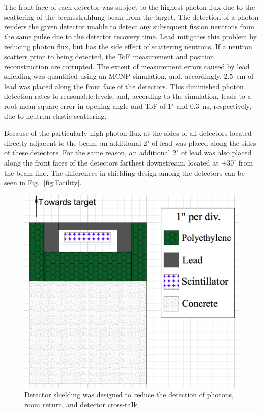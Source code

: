 The front face of each detector was subject to the highest photon flux due to the scattering of the bremsstrahlung beam from the target.
The detection of a photon renders the given detector unable to detect any subsequent fission neutrons from the same pulse due to the detector recovery time.
Lead mitigates this problem by reducing photon flux, but has the side effect of scattering neutrons.
If a neutron scatters prior to being detected, the ToF measurement and position reconstruction are corrupted.
The extent of measurement errors caused by lead shielding was quantified using an MCNP simulation, and, accordingly, 2.5~cm of lead was placed along the front face of the detectors.
This diminished photon detection rates to reasonable levels, and, according to the simulation, leads to a root-mean-square error in opening angle and ToF of 1$^{\circ}$ and 0.3~ns, respectively, due to neutron elastic scattering.

Because of the particularly high photon flux at the sides of all detectors located directly adjacent to the beam, an additional 2" of lead was placed along the sides of these detectors.
For the same reason, an additional 2" of lead was also placed along the front faces of the detectors farthest downstream, located at $\pm30^{\circ}$ from the beam line.
The differences in shielding design among the detectors can be seen in Fig.~\ref{fig:Facility}.
\begin{figure}
    \centering
    \includegraphics[width = \FigShieldingSize\textwidth]{DetShielding.png}
    \caption{Detector shielding was designed to reduce the detection of photons, room return, and detector cross-talk.}
    \label{fig:shielding}
\end{figure}


